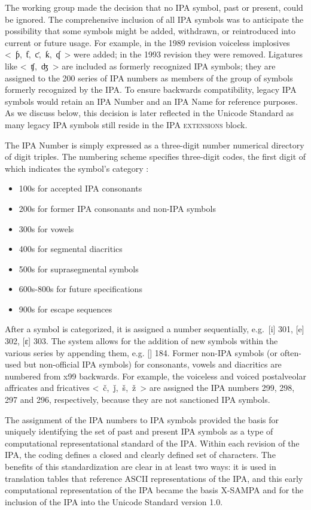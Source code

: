 The working group made the decision that no IPA symbol, past or present, 
could be ignored. The comprehensive inclusion of all IPA symbols was to 
anticipate the possibility that some symbols might be added, withdrawn, 
or reintroduced into current or future usage. For example, in the 1989 
revision voiceless implosives <~ƥ,~ƭ,~ƈ,~ƙ,~ʠ~> were added; in the 1993 
revision they were removed. Ligatures like <~ʧ,~ʤ~> are included as formerly 
recognized IPA symbols; they are assigned to the 200 series of IPA numbers 
as members of the group of symbols formerly recognized by the IPA. To ensure 
backwards compatibility, legacy IPA symbols would retain an IPA Number and 
an IPA Name for reference purposes. As we discuss below, this decision is 
later reflected in the Unicode Standard as many legacy IPA symbols still reside in 
the \textsc{IPA extensions} block.

The IPA Number is simply expressed as a three-digit number numerical directory
of digit triples. The numbering scheme specifies three-digit codes,
the first digit of which indicates the symbol's category
\citep{Esling1990,EslingGaylord1993}:

\begin{itemize}
	\item 100s for accepted IPA consonants
	\item 200s for former IPA consonants and non-IPA symbols
	\item 300s for vowels
	\item 400s for segmental diacritics
	\item 500s for suprasegmental symbols
	\item 600s-800s for future specifications
	\item 900s for escape sequences
\end{itemize}

After a symbol is categorized, it is assigned a number sequentially, e.g.\ [i]
301, [e] 302, [ɛ] 303. The system allows for the addition of new symbols within
the various series by appending them, e.g. [] 184. Former non-IPA
symbols (or often-used but non-official IPA symbols) for consonants, vowels and
diacritics are numbered from x99 backwards. For example, the voiceless and
voiced postalveolar affricates and fricatives <~č,~ǰ,~š,~ž~> are assigned the
IPA numbers 299, 298, 297 and 296, respectively, because they are not sanctioned
IPA symbols.

The assignment of the IPA numbers to IPA symbols provided the basis for uniquely
identifying the set of past and present IPA symbols as a type of computational
representational standard of the IPA. Within each revision of the IPA, the
coding defines a closed and clearly defined set of characters. The benefits of
this standardization are clear in at least two ways: it is used in translation
tables that reference ASCII representations of the IPA, and this early
computational representation of the IPA became the basis X-SAMPA and for the
inclusion of the IPA into the Unicode Standard version 1.0.

